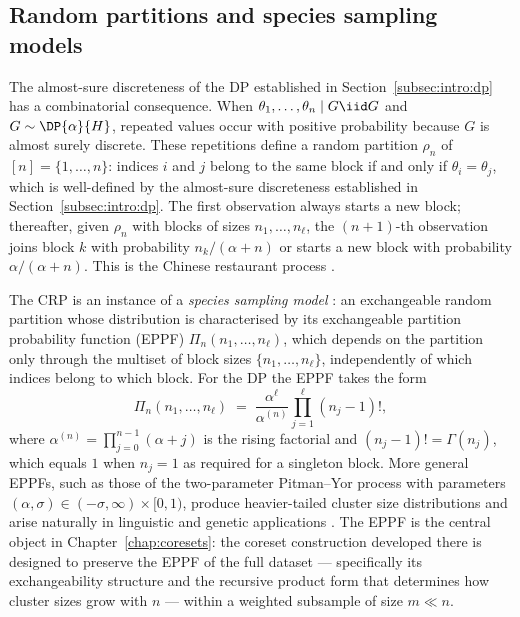 \subsection{Random partitions and species sampling models}
\label{subsec:intro:partitions}

The almost-sure discreteness of the DP established in
Section~\ref{subsec:intro:dp} has a combinatorial consequence.  When
$\theta_1, \ldots, \theta_n \mid G \iid G$ and $G \sim \DP{\alpha}{H}$,
repeated values occur with positive probability because $G$ is almost
surely discrete.  These repetitions define a random partition $\rho_n$ of
$[n] = \{1, \ldots, n\}$: indices $i$ and $j$ belong to the same block if
and only if $\theta_i = \theta_j$, which is well-defined by the almost-sure
discreteness established in Section~\ref{subsec:intro:dp}.  The first
observation always starts a new block; thereafter, given $\rho_n$ with
blocks of sizes $n_1, \ldots, n_\ell$, the $(n+1)$-th observation joins
block $k$ with probability $n_k / (\alpha + n)$ or starts a new block with
probability $\alpha / (\alpha + n)$.  This is the Chinese restaurant
process \citep{Aldous1985, Pitman2006}.

The CRP is an instance of a \emph{species sampling model} \citep{Pitman1996}:
an exchangeable random partition whose distribution is characterised by its
exchangeable partition probability function (EPPF) $\Pi_n(n_1, \ldots,
n_\ell)$, which depends on the partition only through the multiset of block
sizes $\{n_1, \ldots, n_\ell\}$, independently of which indices belong to
which block.  For the DP the EPPF takes the form
\begin{equation}
  \Pi_n(n_1, \ldots, n_\ell)
  \;=\;
  \frac{\alpha^\ell}{\alpha^{(n)}}
  \prod_{j=1}^{\ell} (n_j - 1)!,
  \label{eq:dp-eppf}
\end{equation}
where $\alpha^{(n)} = \prod_{j=0}^{n-1}(\alpha + j)$ is the rising
factorial and $(n_j - 1)! = \Gamma(n_j)$, which equals $1$ when $n_j = 1$
as required for a singleton block.  More general EPPFs, such as those of
the two-parameter Pitman--Yor process \citep{PitmanYor1997} with parameters
$(\alpha, \sigma) \in (-\sigma, \infty) \times [0, 1)$, produce
heavier-tailed cluster size distributions and arise naturally in linguistic
and genetic applications \citep{Teh2006, FavaroLijoiPrunster2012}.  The
EPPF is the central object in Chapter~\ref{chap:coresets}: the coreset
construction developed there is designed to preserve the EPPF of the full
dataset --- specifically its exchangeability structure and the recursive
product form that determines how cluster sizes grow with $n$ --- within a
weighted subsample of size $m \ll n$.

